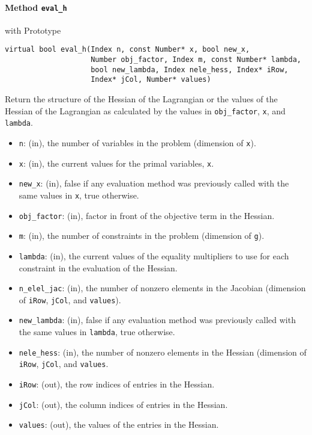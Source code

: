 \documentclass[letter,10pt]{article}
\begin{document}
\paragraph{Method {\texttt{eval\_h}}} with Prototype
\begin{verbatim}
virtual bool eval_h(Index n, const Number* x, bool new_x,
                    Number obj_factor, Index m, const Number* lambda,
                    bool new_lambda, Index nele_hess, Index* iRow,
                    Index* jCol, Number* values)
\end{verbatim}
Return the structure of the Hessian of the Lagrangian or the values of the 
Hessian of the Lagrangian as calculated by the values in {\tt obj\_factor},
{\tt x}, and {\tt lambda}.
\begin{itemize}
\item {\tt n}: (in), the number of variables in the problem (dimension of {\tt x}). 
\item {\tt x}: (in), the current values for the primal variables, {\tt x}.
\item {\tt new\_x}: (in), false if any evaluation method was previously called 
        with the same values in {\tt x}, true otherwise.
\item {\tt obj\_factor}: (in), factor in front of the objective term in the Hessian.
\item {\tt m}: (in), the number of constraints in the problem (dimension of {\tt g}).
\item {\tt lambda}: (in), the current values of the equality multipliers to use
        for each constraint in the evaluation of the Hessian.
\item {\tt n\_elel\_jac}: (in), the number of nonzero elements in the 
        Jacobian (dimension of {\tt iRow}, {\tt jCol}, and {\tt values}).
\item {\tt new\_lambda}: (in), false if any evaluation method was previously called 
        with the same values in {\tt lambda}, true otherwise.
\item {\tt nele\_hess}: (in), the number of nonzero elements in the Hessian 
        (dimension of {\tt iRow}, {\tt jCol}, and {\tt values}.
\item {\tt iRow}: (out), the row indices of entries in the Hessian.
\item {\tt jCol}: (out), the column indices of entries in the Hessian.
\item {\tt values}: (out), the values of the entries in the Hessian.
\end{itemize}
\end{document}
